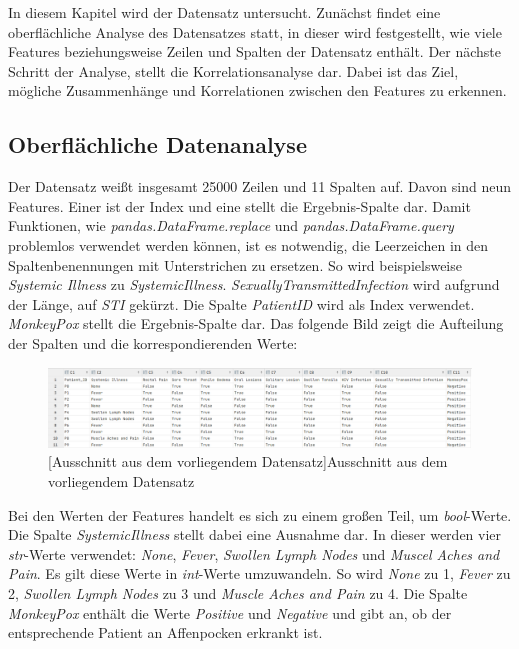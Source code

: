 \documentclass[13pt,a4paper, listof=entryprefix, bibliography=totocnumbered,toc=listofnumbered,lof=listofnumbered]{scrartcl}
\begin{document}
In diesem Kapitel wird der Datensatz untersucht. Zunächst findet eine oberflächliche Analyse des Datensatzes statt, in dieser
wird festgestellt, wie viele Features beziehungsweise Zeilen und Spalten der Datensatz enthält. Der nächste Schritt der Analyse, stellt die Korrelationsanalyse
dar. Dabei ist das Ziel, mögliche Zusammenhänge und Korrelationen zwischen den Features zu erkennen. 

	\subsection{Oberflächliche Datenanalyse}
		\label{ch:oberflaechliche_analyse}

Der Datensatz weißt insgesamt 25000 Zeilen und 11 Spalten auf. Davon sind 
neun Features. Einer ist der Index und eine stellt die Ergebnis-Spalte dar. Damit Funktionen, wie \textit{pandas.DataFrame.replace} und 
\textit{pandas.DataFrame.query} problemlos verwendet werden können, ist es notwendig, die Leerzeichen in den Spaltenbenennungen mit Unterstrichen zu ersetzen. 
So wird beispielsweise \textit{Systemic Illness} zu \textit{Systemic\textunderscore Illness}. \textit{Sexually\textunderscore Transmitted\textunderscore Infection} wird aufgrund der Länge, auf
\textit{STI} gekürzt. Die Spalte \textit{Patient\textunderscore ID} wird als Index verwendet. 
\textit{MonkeyPox} stellt die Ergebnis-Spalte dar. Das folgende Bild zeigt die Aufteilung der Spalten und die korrespondierenden Werte:

	\begin{figure}[H]
		\centering
		\includegraphics[width=0.8\linewidth]{Bilder/data_table.png}
		[Ausschnitt aus dem vorliegendem Datensatz]{Ausschnitt aus dem vorliegendem Datensatz}
		\label{fig:data_table}
	\end{figure}

Bei den Werten der Features handelt es sich zu einem großen Teil, um \textit{bool}-Werte. Die Spalte \textit{Systemic\textunderscore Illness} stellt dabei eine Ausnahme dar. In dieser werden
vier \textit{str}-Werte verwendet: \textit{None}, \textit{Fever}, \textit{Swollen Lymph Nodes} und \textit{Muscel Aches and Pain}. Es gilt diese Werte in \textit{int}-Werte umzuwandeln. So wird \textit{None} zu 1,
\textit{Fever} zu 2, \textit{Swollen Lymph Nodes} zu 3 und \textit{Muscle Aches and Pain} zu 4. Die Spalte \textit{MonkeyPox} enthält die Werte \textit{Positive} und \textit{Negative} und gibt
an, ob der entsprechende Patient an Affenpocken erkrankt ist.
\end{document}
